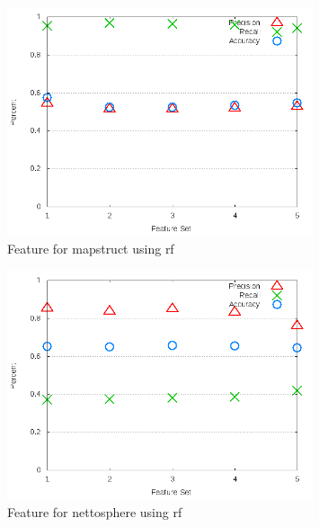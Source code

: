 \begin{figure}[!t]
\centering
\includegraphics[width=0.8\textwidth]{images/rf/test_3/mapstruct_sample_range.png}
\caption{Feature for mapstruct using \gls{rf}}
\label{fig:test_3_mapstruct_rf}
\end{figure}

\begin{figure}[!t]
\centering
\includegraphics[width=0.8\textwidth]{images/rf/test_3/nettosphere_sample_range.png}
\caption{Feature for nettosphere using \gls{rf}}
\label{fig:test_3_nettosphere_rf}
\end{figure}

